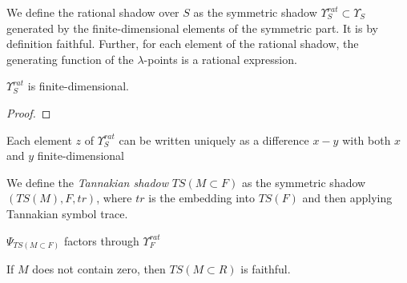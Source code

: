 \begin{propdef}
  We define the rational shadow over $S$ as the symmetric shadow $\Upsilon^{rat}_S \subset \Upsilon_S$ generated by the finite-dimensional elements of the symmetric part. It is by definition faithful. Further, for each element of the rational shadow, the generating function of the $\lambda$-points is a rational expression.
\end{propdef}

\begin{proposition}
  $\Upsilon^{rat}_S$ is finite-dimensional.
\end{proposition}

\begin{proof}
\end{proof}

\begin{proposition}
  Each element $z$ of $\Upsilon^{rat}_S$ can be written uniquely as a difference $x - y$ with both $x$ and $y$ finite-dimensional
\end{proposition}

\begin{definition}
  We define the \emph{Tannakian shadow} $TS(M \subset F)$ as the symmetric shadow $(TS(M), F, tr)$, where $tr$ is the embedding into $TS(F)$ and then applying Tannakian symbol trace. 
\end{definition}

\begin{propdef}
  $\Psi_{TS(M \subset F)}$ factors through $\Upsilon^{rat}_F$
\end{propdef}

\begin{proposition}
  If $M$ does not contain zero, then $TS(M \subset R)$ is faithful. 
\end{proposition}

